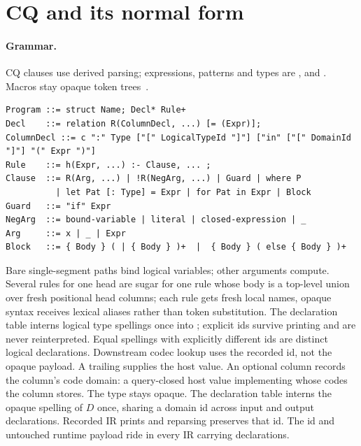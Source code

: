 \section{CQ and its normal form}
\label{sec:cq}\label{sec:languages}

\paragraph{Grammar.}
CQ clauses use derived parsing; expressions, patterns and types are
,  and . Macros stay opaque
token trees~\cite{host-synmacro}.
\begin{lstlisting}
Program ::= struct Name; Decl* Rule+
Decl    ::= relation R(ColumnDecl, ...) [= (Expr)];
ColumnDecl ::= c ":" Type ["[" LogicalTypeId "]"] ["in" ["[" DomainId "]"] "(" Expr ")"]
Rule    ::= h(Expr, ...) :- Clause, ... ;
Clause  ::= R(Arg, ...) | !R(NegArg, ...) | Guard | where P
          | let Pat [: Type] = Expr | for Pat in Expr | Block
Guard   ::= "if" Expr
NegArg  ::= bound-variable | literal | closed-expression | _
Arg     ::= x | _ | Expr
Block   ::= { Body } ( | { Body } )+  |  { Body } ( else { Body } )+
\end{lstlisting}
Bare single-segment paths bind logical variables; other arguments compute.
Several rules for one head are sugar for one rule whose body is a top-level
union over fresh positional head columns; each rule gets fresh local names,
opaque syntax receives lexical aliases rather than token substitution.
The declaration table interns logical type spellings once into
; explicit ids survive printing and are never reinterpreted.
Equal spellings with explicitly different ids are distinct logical declarations.
Downstream codec lookup uses the recorded id, not the opaque  payload.
A trailing  supplies the host value. An optional column
 records the column's code domain: a query-closed host value
implementing  whose codes the column stores.
The type stays opaque. The declaration table interns the opaque spelling of
$D$ once, sharing a domain id across input and output declarations.
Recorded IR prints  and reparsing preserves that id.
The id and untouched runtime payload ride in every IR carrying declarations.

